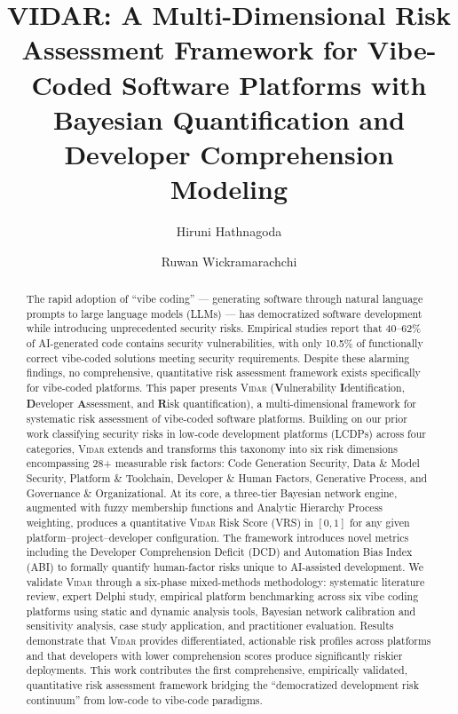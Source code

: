 \documentclass[preprint,review,12pt]{elsarticle}
\newcommand{\vidar}{\textsc{Vidar}}
\begin{document}
\begin{frontmatter}

\title{VIDAR: A Multi-Dimensional Risk Assessment Framework for Vibe-Coded Software Platforms with Bayesian Quantification and Developer Comprehension Modeling}

\author[uok]{Hiruni Hathnagoda}

\author[uok]{Ruwan Wickramarachchi}



\begin{abstract}
The rapid adoption of ``vibe coding'' --- generating software through natural language prompts to large language models (LLMs) --- has democratized software development while introducing unprecedented security risks. Empirical studies report that 40--62\% of AI-generated code contains security vulnerabilities, with only 10.5\% of functionally correct vibe-coded solutions meeting security requirements. Despite these alarming findings, no comprehensive, quantitative risk assessment framework exists specifically for vibe-coded platforms. This paper presents \vidar{} (\textbf{V}ulnerability \textbf{I}dentification, \textbf{D}eveloper \textbf{A}ssessment, and \textbf{R}isk quantification), a multi-dimensional framework for systematic risk assessment of vibe-coded software platforms. Building on our prior work classifying security risks in low-code development platforms (LCDPs) across four categories, \vidar{} extends and transforms this taxonomy into six risk dimensions encompassing 28+ measurable risk factors: Code Generation Security, Data \& Model Security, Platform \& Toolchain, Developer \& Human Factors, Generative Process, and Governance \& Organizational. At its core, a three-tier Bayesian network engine, augmented with fuzzy membership functions and Analytic Hierarchy Process weighting, produces a quantitative \vidar{} Risk Score (VRS) in $[0, 1]$ for any given platform--project--developer configuration. The framework introduces novel metrics including the Developer Comprehension Deficit (DCD) and Automation Bias Index (ABI) to formally quantify human-factor risks unique to AI-assisted development. We validate \vidar{} through a six-phase mixed-methods methodology: systematic literature review, expert Delphi study, empirical platform benchmarking across six vibe coding platforms using static and dynamic analysis tools, Bayesian network calibration and sensitivity analysis, case study application, and practitioner evaluation. Results demonstrate that \vidar{} provides differentiated, actionable risk profiles across platforms and that developers with lower comprehension scores produce significantly riskier deployments. This work contributes the first comprehensive, empirically validated, quantitative risk assessment framework bridging the ``democratized development risk continuum'' from low-code to vibe-code paradigms.
\end{abstract}


\end{frontmatter}
\end{document}
